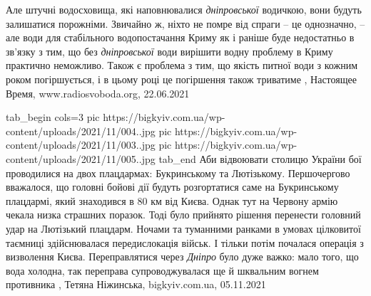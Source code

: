 Але штучні водосховища, які наповнювалися \emph{дніпровської} водичкою, вони будуть
залишатися порожніми. Звичайно ж, ніхто не помре від спраги – це однозначно, –
але води для стабільного водопостачання Криму як і раніше буде недостатньо в
зв'язку з тим, що без \emph{дніпровської} води вирішити водну проблему в Криму
практично неможливо.  Також є проблема з тим, що якість питної води з кожним
роком погіршується, і в цьому році це погіршення також триватиме
, 
Настоящее Время, www.radiosvoboda.org, 22.06.2021

\ifcmt
  tab_begin cols=3
     pic https://bigkyiv.com.ua/wp-content/uploads/2021/11/004..jpg
     pic https://bigkyiv.com.ua/wp-content/uploads/2021/11/003..jpg
		 pic https://bigkyiv.com.ua/wp-content/uploads/2021/11/005..jpg
  tab_end
\fi
Аби відвоювати столицю України бої проводилися на двох плацдармах: Букринському
та Лютізькому. Першочергово вважалося, що головні бойові дії будуть
розгортатися саме на Букринському плацдармі, який знаходився в 80 км від Києва.
Однак тут на Червону армію чекала низка страшних поразок. Тоді було прийнято
рішення перенести головний удар на Лютізький плацдарм. Ночами та туманними
ранками в умовах цілковитої таємниці здійснювалася передислокація військ. І
тільки потім почалася операція з визволення Києва.  Переправлятися через
\emph{Дніпро} було дуже важко: мало того, що вода холодна, так переправа
супроводжувалася ще й шквальним вогнем противника
, 
Тетяна Ніжинська, bigkyiv.com.ua, 05.11.2021
